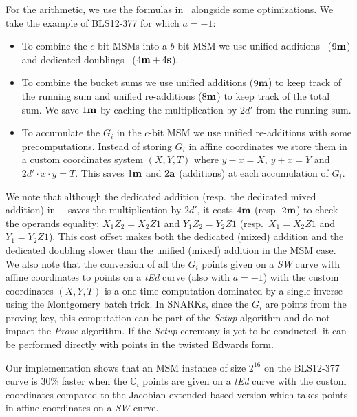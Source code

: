 \documentclass[journal=tches,spthm]{iacrtrans}
\newcommand{\bfm}{{\bf m}}
\newcommand{\bfa}{{\bf a}}
\newcommand{\bfs}{{\bf s}}
\newcommand{\G}{\ensuremath{\mathbb G}}
\begin{document}
For the arithmetic, we use the formulas in~\cite{AC:HWCD08} alongside some
optimizations. We take the example of BLS12-377 for which $a=-1$:
\begin{itemize}
    \item To combine the $c$-bit MSMs into a $b$-bit MSM we use unified
        additions~\cite[Sec.~3.1]{AC:HWCD08} ($9\bfm$) and dedicated
        doublings~\cite[Sec.~3.3]{AC:HWCD08} ($4\bfm+4\bfs$).
    \item To combine the bucket sums we use unified additions ($9\bfm$) to keep
        track of the running sum and unified re-additions ($8\bfm$) to keep
        track of the total sum. We save $1\bfm$ by caching the multiplication
        by $2d'$ from the running sum.
    \item To accumulate the $G_i$ in the $c$-bit MSM we use unified
        re-additions with some precomputations. Instead of storing $G_i$ in
        affine coordinates we store them in a custom coordinates system
        $(X,Y,T)$ where $y-x=X$, $y+x=Y$ and $2d'\cdot x\cdot y=T$. This saves
        $1\bfm$ and $2\bfa$ (additions) at each accumulation of $G_i$.
\end{itemize}

We note that although the dedicated addition (resp.~the dedicated mixed
addition) in~~\cite[Sec.~3.2]{AC:HWCD08} saves the multiplication by $2d'$, it
costs $4\bfm$ (resp. $2\bfm$) to check the operands equality: $X_1Z_2 = X_2Z1$
and $Y_1Z_2 = Y_2Z1$ (resp.~$X_1 = X_2Z1$ and $Y_1 = Y_2Z1$). This cost offset
makes both the dedicated (mixed) addition and the dedicated doubling slower
than the unified (mixed) addition in the MSM case. We also note that the
conversion of all the $G_i$ points given on a \textit{SW} curve with
affine coordinates to points on a \textit{tEd} curve (also with $a=-1$) with
the custom coordinates $(X,Y,T)$ is a one-time computation dominated by a
single inverse using the Montgomery batch trick. In SNARKs, since the $G_i$ are
points from the proving key, this computation can be part of the \textit{Setup}
algorithm and do not impact the \textit{Prove} algorithm. If the \textit{Setup}
ceremony is yet to be conducted, it can be performed directly with points in
the twisted Edwards form.

Our implementation shows that an MSM instance of size
$2^{16}$ on the BLS12-377 curve is 30\% faster when the $\G_i$ points are given
on a \textit{tEd} curve with the custom coordinates compared to the
Jacobian-extended-based version which takes points in affine coordinates on a
\textit{SW} curve.
\end{document}
